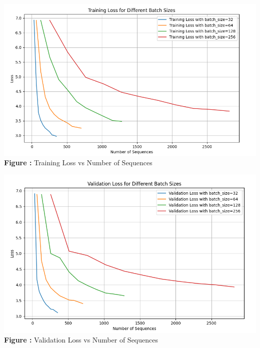 \documentclass[11pt,addpoints,answers]{exam}
\begin{document}
\begin{questions}
\begin{parts}
\begin{subparts}
    \begin{your_solution}[height=7cm]
	\begin{minipage}{0.48\linewidth}
	\centering
	\includegraphics[width=\linewidth]{../handout/Q5_2_training.png}
	 \\ %
	{\tiny \textbf{Figure \thefigure:} Training Loss vs Number of Sequences}  %
	\label{fig:Q5_2_training}         %
	\end{minipage}
\hfill
	\begin{minipage}{0.48\linewidth}
	\centering
	\includegraphics[width=\linewidth]{../handout/Q5_2_validation.png}
	 \\ %
	{\tiny \textbf{Figure \thefigure:} Validation Loss vs Number of Sequences} %
	\label{fig:Q5_2_validation}         %
	\end{minipage}        
    \end{your_solution}
    

\end{subparts}
\end{parts}
\end{questions}
\end{document}
